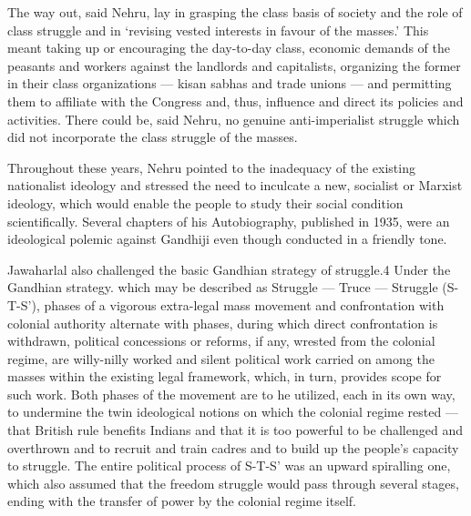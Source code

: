The way out, said Nehru, lay in grasping the class basis of society and the role of class struggle and in `revising vested interests in favour of the masses.' This meant taking up or encouraging the day-to-day class, economic demands of the peasants and workers against the landlords and capitalists, organizing the former in their class organizations — kisan sabhas and trade unions — and permitting them to affiliate with the Congress and, thus, influence and direct its policies and activities. There could be, said Nehru, no genuine anti-imperialist struggle which did not incorporate the class struggle of the masses. 

Throughout these years, Nehru pointed to the inadequacy of the existing nationalist ideology and stressed the need to inculcate a new, socialist or Marxist ideology, which would enable the people to study their social condition scientifically. Several chapters of his Autobiography, published in 1935, were an ideological polemic against Gandhiji even though conducted in a friendly tone. 

Jawaharlal also challenged the basic Gandhian strategy of struggle.4 Under the Gandhian strategy. which may be described as Struggle — Truce — Struggle (S-T-S'), phases of a vigorous extra-legal mass movement and confrontation with colonial authority alternate with phases, during which direct confrontation is withdrawn, political concessions or reforms, if any, wrested from the colonial regime, are willy-nilly worked and silent political work carried on among the masses within the existing legal framework, which, in turn, provides scope for such work. Both phases of the movement are to he utilized, each in its own way, to undermine the twin ideological notions on which the colonial regime rested — that British rule benefits Indians and that it is too powerful to be challenged and overthrown and to recruit and train cadres and to build up the people's capacity to struggle. The entire political process of S-T-S' was an upward spiralling one, which also assumed that the freedom struggle would pass through several stages, ending with the transfer of power by the colonial regime itself. 

